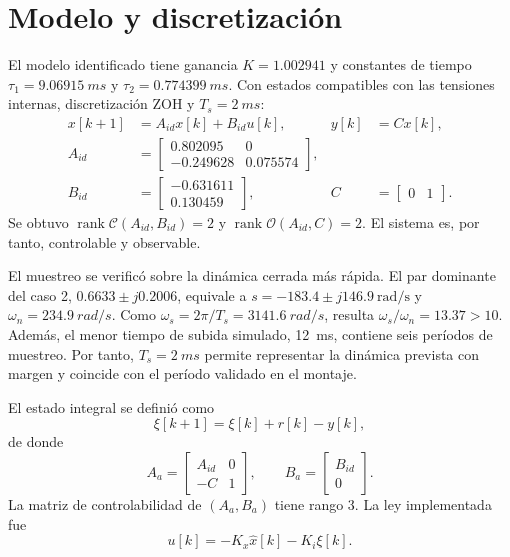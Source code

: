 \documentclass[conference]{IEEEtran}
\begin{document}
\section{Modelo y discretización}
El modelo identificado tiene ganancia $K=1.002941$ y constantes de tiempo $\tau_1=\SI{9.06915}{ms}$ y $\tau_2=\SI{0.774399}{ms}$. Con estados compatibles con las tensiones internas, discretización ZOH y $T_s=\SI{2}{ms}$:
\begin{align}
x[k+1]&=A_{id}x[k]+B_{id}u[k], & y[k]&=Cx[k],\\
A_{id}&=\begin{bmatrix}0.802095&0\\-0.249628&0.075574\end{bmatrix},\\
B_{id}&=\begin{bmatrix}-0.631611\\0.130459\end{bmatrix},&
C&=\begin{bmatrix}0&1\end{bmatrix}.
\end{align}
Se obtuvo $\operatorname{rank}\mathcal{C}(A_{id},B_{id})=2$ y $\operatorname{rank}\mathcal{O}(A_{id},C)=2$. El sistema es, por tanto, controlable y observable.

El muestreo se verificó sobre la dinámica cerrada más rápida. El par dominante del caso 2, $0.6633\pm j0.2006$, equivale a $s=-183.4\pm j146.9\ \mathrm{rad/s}$ y $\omega_n=\SI{234.9}{rad/s}$. Como $\omega_s=2\pi/T_s=\SI{3141.6}{rad/s}$, resulta $\omega_s/\omega_n=13.37>10$. Además, el menor tiempo de subida simulado, \SI{12}{ms}, contiene seis períodos de muestreo. Por tanto, $T_s=\SI{2}{ms}$ permite representar la dinámica prevista con margen y coincide con el período validado en el montaje.

El estado integral se definió como
\begin{equation}
\xi[k+1]=\xi[k]+r[k]-y[k],
\end{equation}
de donde
\begin{equation}
A_a=\begin{bmatrix}A_{id}&0\\-C&1\end{bmatrix},\qquad
B_a=\begin{bmatrix}B_{id}\\0\end{bmatrix}.
\end{equation}
La matriz de controlabilidad de $(A_a,B_a)$ tiene rango 3. La ley implementada fue
\begin{equation}
u[k]=-K_x\hat{x}[k]-K_i\xi[k].
\end{equation}
\end{document}

